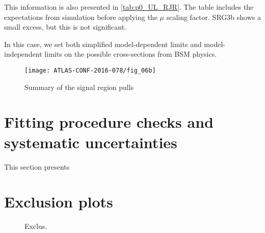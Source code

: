 This information is also presented in \ref{tab:p0_UL_RJR}.
The table includes the expectations from simulation before applying the $\mu$ scaling factor.
SRG3b shows a small excess, but this is not significant.

In this case, we set both simplified model-dependent limits and model-independent limits on the possible cross-sections from BSM physics.

\begin{figure}[tbph]
\centering
\caption{Summary of the signal region pulls} \label{fig:sr_summary}
\texttt{[image: ATLAS-CONF-2016-078/fig\_06b]}
\end{figure}


\section{Fitting procedure checks and systematic uncertainties}

This section presents


\section{Exclusion plots}

\begin{figure}[tbph]
\centering
\caption{Exclus.}
\label{fig:srs_scale}
\end{figure}
